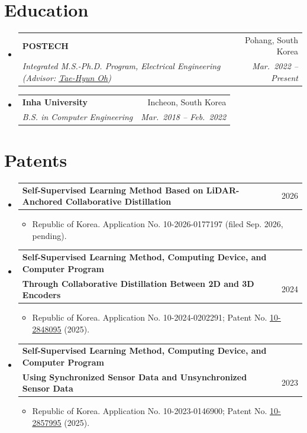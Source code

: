 \documentclass[letterpaper,11pt]{article}
\makeatletter
\newcommand{\resumeItem}[1]{
  \item\small{
    {#1 \vspace{-2pt}}
  }
}
\newcommand{\resumeSubheading}[4]{
  \vspace{-2pt}\item
    \begin{tabular*}{0.97\textwidth}[t]{l@{\extracolsep{\fill}}r}
      \textbf{#1} & #2 \\
      \textit{\small#3} & \textit{\small #4} \\
    \end{tabular*}\vspace{-7pt}
}
\newcommand{\resumeProjectHeading}[2]{
    \item
    \begin{tabular*}{0.97\textwidth}{l@{\extracolsep{\fill}}r}
      \small#1 & #2 \\
    \end{tabular*}\vspace{-7pt}
}
\newcommand{\resumeSubHeadingListStart}{\begin{itemize}[leftmargin=0.15in, label={}]}
\newcommand{\resumeSubHeadingListEnd}{\end{itemize}}
\newcommand{\resumeItemListStart}{\begin{itemize}}
\newcommand{\resumeItemListEnd}{\end{itemize}\vspace{-5pt}}
\makeatother
\begin{document}
\section{Education}
  \resumeSubHeadingListStart
    \resumeSubheading
      {POSTECH}{Pohang, South Korea}
      {Integrated M.S.-Ph.D. Program, Electrical Engineering (Advisor: \href{https://ami.kaist.ac.kr/members/tae-hyun-oh}{\underline{Tae-Hyun Oh}})}{Mar.~2022 -- Present}
    \resumeSubheading
      {Inha University}{Incheon, South Korea}
      {B.S. in Computer Engineering}{Mar.~2018 -- Feb.~2022}
  \resumeSubHeadingListEnd

\section{Patents}
    \resumeSubHeadingListStart
      \resumeProjectHeading
    {\textbf{Self-Supervised Learning Method Based on LiDAR-Anchored Collaborative Distillation}}{2026}
    \resumeItemListStart
      \resumeItem{Republic of Korea. Application No. 10-2026-0177197 (filed Sep. 2026, pending).}
    \resumeItemListEnd
      \resumeProjectHeading
    {\textbf{Self-Supervised Learning Method, Computing Device, and Computer Program} \\ \textbf{Through Collaborative Distillation Between 2D and 3D Encoders}}{2024}
    \resumeItemListStart
      \resumeItem{Republic of Korea. Application No. 10-2024-0202291; Patent No. \href{https://patents.google.com/patent/KR102848095B1/ko}{\underline{10-2848095}} (2025).}
    \resumeItemListEnd
      \resumeProjectHeading
    {\textbf{Self-Supervised Learning Method, Computing Device, and Computer Program} \\ \textbf{Using Synchronized Sensor Data and Unsynchronized Sensor Data}}{2023}
    \resumeItemListStart
      \resumeItem{Republic of Korea. Application No. 10-2023-0146900; Patent No. \href{https://patents.google.com/patent/KR102857995B1/ko}{\underline{10-2857995}} (2025).}
    \resumeItemListEnd
    \resumeSubHeadingListEnd

\end{document}
